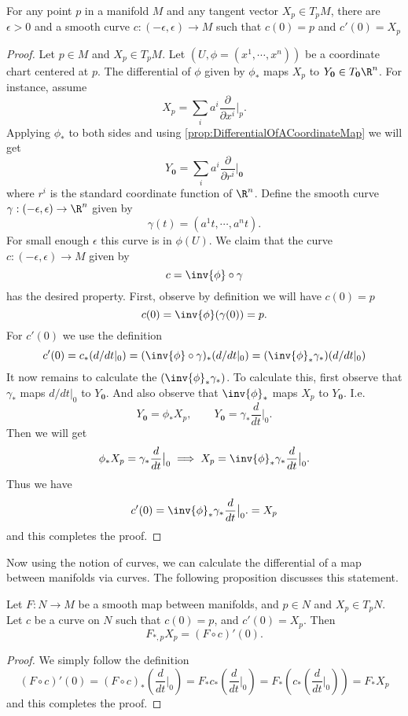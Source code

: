 \begin{proposition}
	For any point $ p $ in a manifold $ M $ and any tangent vector $ X_p \in T_pM $, there are $ \epsilon>0 $ and a smooth curve $ c:(-\epsilon,\epsilon) \to M $ such that $ c(0) = p $ and $ c'(0) = X_p $
\end{proposition}
\begin{proof}
	Let $ p \in M $ and $ X_p \in T_pM $.  Let $ (U,\phi = (x^1,\cdots,x^n)) $ be a coordinate chart centered at $ p $. The differential of $ \phi $ given by $ \phi_* $ maps $ X_p $ to $ Y_{\mathbf{0}} \in T_\mathbf{0}\R^n $. For instance, assume 
	\[ X_p = \sum_i a^i \frac{\partial}{\partial  x^i}\big|_{p}. \]
	Applying $ \phi_* $ to both sides and using \autoref{prop:DifferentialOfACoordinateMap} we will get
	\[ Y_\mathbf{0} =  \sum_i a^i \frac{\partial}{\partial  r^i}\big|_{\mathbf{0}}  \]
	where $ r^i $ is the standard coordinate function of $ \R^n $. Define the smooth curve $ \gamma: (-\epsilon, \epsilon) \to \R^n $ given by
	\[ \gamma(t) = (a^1t, \cdots, a^n t). \]
	For small enough $ \epsilon $ this curve is in $ \phi(U) $. We claim that the curve $ c:(-\epsilon,\epsilon)\to M $ given by
	\[ c = \inv{\phi} \circ \gamma \] 
	has the desired property. First, observe by definition we will have $ c(0) = p $
	\[ c(0) = \inv{\phi}(\gamma(0)) = p. \]
	For $ c'(0) $ we use the definition
	\[ c'(0) = c_*(d/dt|_{0}) = (\inv{\phi}\circ \gamma)_*(d/dt|_{0}) = (\inv{\phi}_*  \gamma_*)(d/dt|_{0})  \]
	It now remains to calculate the $ (\inv{\phi}_* \gamma_*) $. To calculate this, first observe that $ \gamma_* $ maps $ d/dt|_0 $ to $ Y_\mathbf{0} $. And also observe that $ \inv{\phi}_* $ maps $ X_p $ to $ Y_\mathbf{0} $. I.e.
	\[ Y_\mathbf{0} = \phi_* X_p, \qquad Y_\mathbf{0} = \gamma_* \frac{d}{dt}\big|_0. \]
	Then we will get
	\[ \phi_* X_p = \gamma_* \frac{d}{d  t}\big|_{0} \implies X_p = \inv{\phi}_* \gamma_* \frac{d}{dt}\big|_0. \]
	Thus we have
	\[ c'(0) =  \inv{\phi}_* \gamma_* \frac{d}{dt}\big|_0. = X_p\]
	and this completes the proof.
\end{proof}

Now using the notion of curves, we can calculate the differential of a map between manifolds via curves. The following proposition discusses this statement.
\begin{proposition}
	\label{prop:curvesToComputeDifferential}
	Let $ F: N  \to M$ be a smooth map between manifolds, and $ p \in N $ and $ X_p \in T_pN $. Let $ c $ be a curve on $ N $ such that $ c(0) = p $, and $ c'(0) = X_p $. Then
	\[ F_{*,p} X_p = (F\circ c)' (0). \]
\end{proposition}
\begin{proof}
	We simply follow the definition
	\[(F\circ c)'(0) = (F\circ c)_* (\frac{d}{dt}\big|_0) = F_* c_* (\frac{d}{dt}\big|_0) = F_* \left(  c_* (\frac{d}{dt}\big|_0) \right) = F_* X_p \]
	and this completes the proof.
\end{proof}


